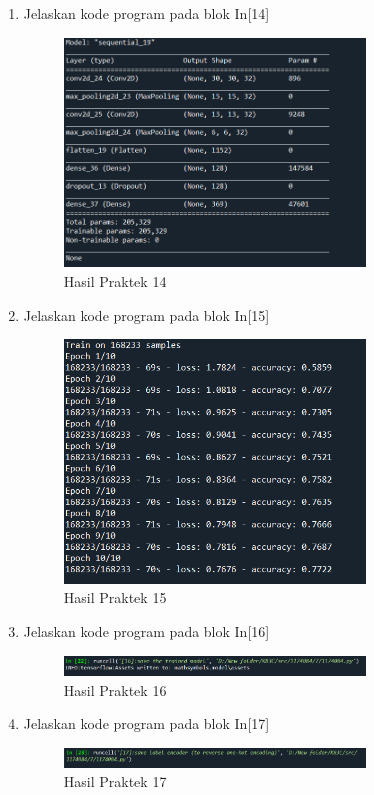 \begin{enumerate}
\item Jelaskan kode program pada blok In[14]
	
\begin{figure}[H]
    \includegraphics[width=8cm]{figures/1174084/7/14.png}
    \centering
    \caption{Hasil Praktek 14}
\end{figure}

\item Jelaskan kode program pada blok In[15]
	
\begin{figure}[H]
    \includegraphics[width=8cm]{figures/1174084/7/15.png}
    \centering
    \caption{Hasil Praktek 15}
\end{figure}

\item Jelaskan kode program pada blok In[16]
	
\begin{figure}[H]
    \includegraphics[width=8cm]{figures/1174084/7/16.png}
    \centering
    \caption{Hasil Praktek 16}
\end{figure}

\item Jelaskan kode program pada blok In[17]
	
\begin{figure}[H]
    \includegraphics[width=8cm]{figures/1174084/7/17.png}
    \centering
    \caption{Hasil Praktek 17}
\end{figure}


\end{enumerate}
